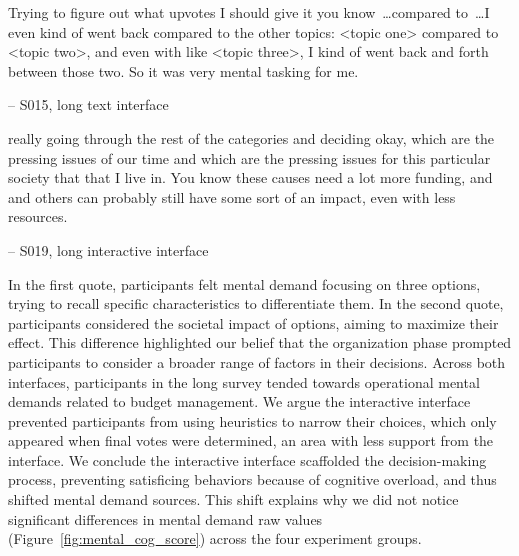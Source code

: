     

\begin{displayquote}
Trying to figure out what upvotes I should give it you know~\ldots compared to~\ldots I even kind of went back compared to the other topics: <topic one> compared to <topic two>, and even with like <topic three>, I kind of went back and forth between those two. \bracketellipsis So it was very mental tasking for me.

\noindent \hfill -- S015, long text interface
\end{displayquote}

    

\begin{displayquote}
\bracketellipsis really going through the rest of the categories and deciding okay, which are the pressing issues of our time and which are the pressing issues for this particular society that that I live in. \bracketellipsis You know these causes need a lot more funding, and and others can probably still have some sort of an impact, even with less resources.

\noindent \hfill -- S019, long interactive interface
\end{displayquote}

In the first quote, participants felt mental demand focusing on three options, trying to recall specific characteristics to differentiate them. In the second quote, participants considered the societal impact of options, aiming to maximize their effect. This difference highlighted our belief that the organization phase prompted participants to consider a broader range of factors in their decisions. Across both interfaces, participants in the long survey tended towards operational mental demands related to budget management. We argue the interactive interface prevented participants from using heuristics to narrow their choices, which only appeared when final votes were determined, an area with less support from the interface. We conclude the interactive interface scaffolded the decision-making process, preventing satisficing behaviors because of cognitive overload, and thus shifted mental demand sources. This shift explains why we did not notice significant differences in mental demand raw values (Figure~\ref{fig:mental_cog_score}) across the four experiment groups.

